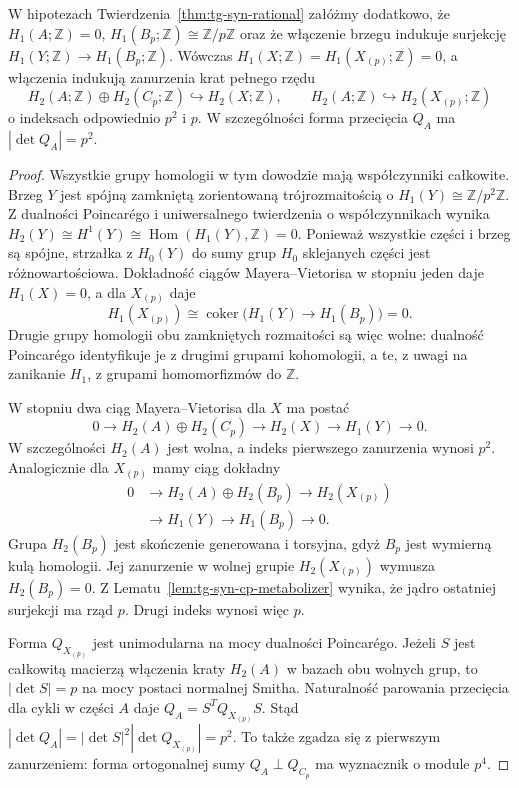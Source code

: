 \begin{stwierdzenie}
\label{prop:tg-syn-integral-index}
W hipotezach Twierdzenia~\ref{thm:tg-syn-rational}
załóżmy dodatkowo, że $H_1(A;\mathbb Z)=0$,
$H_1(B_p;\mathbb Z)\cong\mathbb Z/p\mathbb Z$
oraz że włączenie brzegu indukuje surjekcję
$H_1(Y;\mathbb Z)\to H_1(B_p;\mathbb Z)$.
Wówczas $H_1(X;\mathbb Z)=H_1(X_{(p)};\mathbb Z)=0$,
a włączenia indukują zanurzenia krat pełnego rzędu
\[
 H_2(A;\mathbb Z)\oplus H_2(C_p;\mathbb Z)
 \hookrightarrow H_2(X;\mathbb Z),\qquad
 H_2(A;\mathbb Z)\hookrightarrow H_2(X_{(p)};\mathbb Z)
\]
o indeksach odpowiednio $p^2$ i $p$.
W szczególności forma przecięcia $Q_A$ ma
$|\det Q_A|=p^2$.
\end{stwierdzenie}

\begin{proof}
Wszystkie grupy homologii w tym dowodzie mają
współczynniki całkowite. Brzeg $Y$ jest spójną
zamkniętą zorientowaną trójrozmaitością o
$H_1(Y)\cong\mathbb Z/p^2\mathbb Z$.
Z dualności Poincarégo i uniwersalnego twierdzenia
o współczynnikach wynika
$H_2(Y)\cong H^1(Y)\cong\operatorname{Hom}(H_1(Y),\mathbb Z)=0$.
Ponieważ wszystkie części i brzeg są spójne,
strzałka z $H_0(Y)$ do sumy grup $H_0$
sklejanych części jest różnowartościowa.
Dokładność ciągów Mayera--Vietorisa w stopniu jeden
daje $H_1(X)=0$, a dla $X_{(p)}$ daje
\[
 H_1(X_{(p)})\cong
 \operatorname{coker}\bigl(H_1(Y)\to H_1(B_p)\bigr)=0.
\]
Drugie grupy homologii obu zamkniętych rozmaitości
są więc wolne: dualność Poincarégo identyfikuje je
z drugimi grupami kohomologii, a te, z uwagi na
zanikanie $H_1$, z grupami homomorfizmów do
$\mathbb Z$.

W stopniu dwa ciąg Mayera--Vietorisa dla $X$ ma
postać
\[
 0\longrightarrow H_2(A)\oplus H_2(C_p)
 \longrightarrow H_2(X)
 \longrightarrow H_1(Y)\longrightarrow0.
\]
W szczególności $H_2(A)$ jest wolna, a indeks
pierwszego zanurzenia wynosi $p^2$.
Analogicznie dla $X_{(p)}$ mamy ciąg dokładny
\[
 \begin{aligned}
 0&\longrightarrow H_2(A)\oplus H_2(B_p)
 \longrightarrow H_2(X_{(p)})\\
 &\longrightarrow H_1(Y)\longrightarrow H_1(B_p)
 \longrightarrow0.
 \end{aligned}
\]
Grupa $H_2(B_p)$ jest skończenie generowana i torsyjna,
gdyż $B_p$ jest wymierną kulą homologii.
Jej zanurzenie w wolnej grupie $H_2(X_{(p)})$
wymusza $H_2(B_p)=0$. Z Lematu~\ref{lem:tg-syn-cp-metabolizer}
wynika, że jądro ostatniej surjekcji ma rząd $p$.
Drugi indeks wynosi więc $p$.

Forma $Q_{X_{(p)}}$ jest unimodularna na mocy
dualności Poincarégo. Jeżeli $S$ jest całkowitą
macierzą włączenia kraty $H_2(A)$ w bazach obu
wolnych grup, to $|\det S|=p$ na mocy postaci
normalnej Smitha. Naturalność parowania przecięcia
dla cykli w części $A$ daje
$Q_A=S^TQ_{X_{(p)}}S$. Stąd
$|\det Q_A|=|\det S|^2|\det Q_{X_{(p)}}|=p^2$.
To także zgadza się z pierwszym zanurzeniem:
forma ortogonalnej sumy $Q_A\perp Q_{C_p}$
ma wyznacznik o module $p^4$.
\end{proof}

